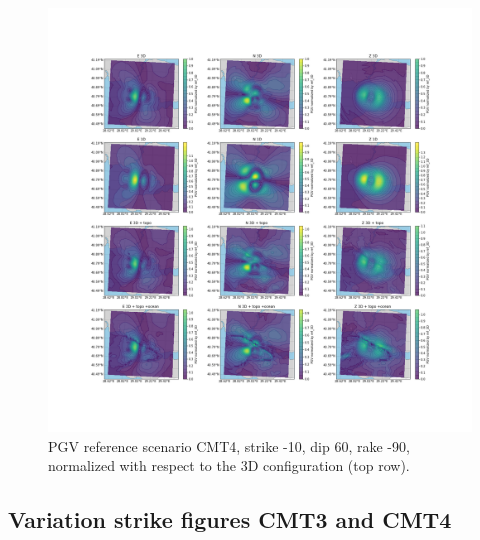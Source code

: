 \documentclass[../Text/00main.tex]{subfiles}
\begin{document}
\begin{figure}[h]
    \centering
    \includegraphics[width=1.2\linewidth]{images_results/Ref_scenarios_normalized_sc4.png}
    \caption{PGV reference scenario CMT4, strike -10, dip 60, rake -90, normalized with respect to the 3D configuration (top row).}
    \label{fig:ref_CMT4}
\end{figure}


\subsection{Variation strike figures CMT3 and CMT4}
\end{document}

